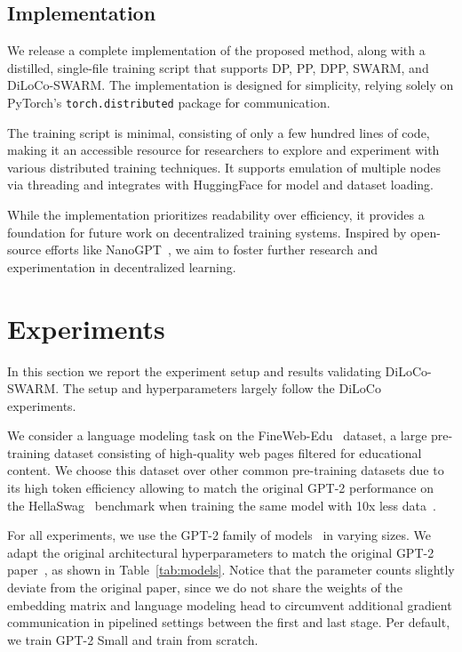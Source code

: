 \documentclass{article}
\begin{document}
\subsection{Implementation}

We release a complete implementation of the proposed method, along with a distilled, single-file training script that supports DP, PP, DPP, SWARM, and DiLoCo-SWARM. The implementation is designed for simplicity, relying solely on PyTorch's \texttt{torch.distributed} package for communication. 

The training script is minimal, consisting of only a few hundred lines of code, making it an accessible resource for researchers to explore and experiment with various distributed training techniques. It supports emulation of multiple nodes via threading and integrates with HuggingFace for model and dataset loading. 

While the implementation prioritizes readability over efficiency, it provides a foundation for future work on decentralized training systems. Inspired by open-source efforts like NanoGPT~\cite{karpathy2024nanogpt}, we aim to foster further research and experimentation in decentralized learning.

\section{Experiments}

In this section we report the experiment setup and results validating
DiLoCo-SWARM. The setup and hyperparameters largely follow the
DiLoCo~\cite{douillard2023diloco} experiments.

We consider a language modeling task on the FineWeb-Edu~\cite{penedo2024fineweb}
dataset, a large pre-training dataset consisting of high-quality web pages
filtered for educational content. We choose this dataset over other common
pre-training datasets due to its high token efficiency allowing to match the
original GPT-2 performance on the HellaSwag~\cite{zellers2019hellaswag}
benchmark when training the same model with 10x less
data~\cite{karpathy2024nanogpt}.

For all experiments, we use the GPT-2 family of models~\cite{radford2019gpt2} in
varying sizes. We adapt the original architectural hyperparameters to match the
original GPT-2 paper~\cite{radford2019gpt2}, as shown in Table~\ref{tab:models}.
Notice that the parameter counts slightly deviate from the original paper, since
we do not share the weights of the embedding matrix and language modeling head
to circumvent additional gradient communication in pipelined settings between
the first and last stage. Per default, we train GPT-2 Small and train from
scratch.
\end{document}

